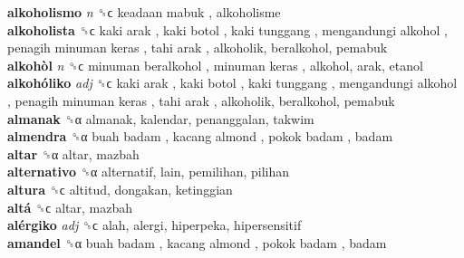 \textbf{alkoholismo} \emph{n}  ␝ϲ   keadaan mabuk , alkoholisme  \\
\textbf{alkoholista} ␝ϲ   kaki arak ,  kaki botol ,  kaki tunggang ,  mengandungi alkohol ,  penagih minuman keras ,  tahi arak , alkoholik, beralkohol, pemabuk  \\
\textbf{alkohòl} \emph{n}  ␝ϲ   minuman beralkohol ,  minuman keras , alkohol, arak, etanol  \\
\textbf{alkohóliko} \emph{adj}  ␝ϲ   kaki arak ,  kaki botol ,  kaki tunggang ,  mengandungi alkohol ,  penagih minuman keras ,  tahi arak , alkoholik, beralkohol, pemabuk  \\
\textbf{almanak} ␝α  almanak, kalendar, penanggalan, takwim  \\
\textbf{almendra} ␝α   buah badam ,  kacang almond ,  pokok badam , badam  \\
\textbf{altar} ␝α  altar, mazbah  \\
\textbf{alternativo} ␝α  alternatif, lain, pemilihan, pilihan  \\
\textbf{altura} ␝ϲ  altitud, dongakan, ketinggian  \\
\textbf{altá} ␝ϲ  altar, mazbah  \\
\textbf{alérgiko} \emph{adj}  ␝ϲ  alah, alergi, hiperpeka, hipersensitif  \\
\textbf{amandel} ␝α   buah badam ,  kacang almond ,  pokok badam , badam  \\
